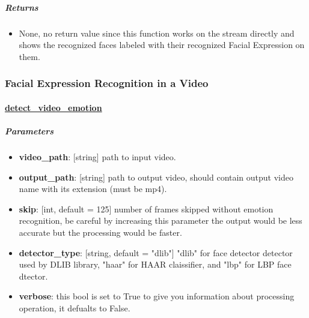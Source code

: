 \subparagraph{Returns}
\begin{changemargin}{0.5cm}{0cm}
\begin{itemize}[noitemsep,nolistsep]
	\item None, no return value since this function works on the stream directly and shows the recognized faces labeled with their recognized Facial Expression on them.
\end{itemize}
\end{changemargin}
	
\begin{comment}
\subparagraph{Usage}:
\begin{changemargin}{0.5cm}{0cm}
\begin{itemize}
	\item import the module:
	\begin{lstlisting}[language=Python]
	from Cerebro.interface Import video_stream as vs\end{lstlisting}
	\item call it:
	\begin{lstlisting}[language=Python]
	vs.detect_stream_emotions(skip)\end{lstlisting}
\end{itemize}
\end{changemargin}
\end{comment}
\hrulefill

\subsubsection{Facial Expression Recognition in a Video}
\paragraph{\underline{detect\_video\_emotion}}
\subparagraph{Parameters}
\begin{changemargin}{0.5cm}{0cm} 
	\begin{itemize}
		\item  \textbf{video\_path}: [string] path to input video.
		\item  \textbf{output\_path}: [string] path to output video, should contain output video name with its extension (must be mp4).
		\item  \textbf{skip}: [int, default = 125] number of frames skipped without emotion recognition, be careful by increasing this parameter the output would be less accurate but the processing would be faster.
		\item \textbf{detector\_type}: [string, default = "dlib"] "dlib" for face detector detector used by DLIB library, "haar" for HAAR claissifier, and "lbp" for LBP face dtector.
		\item  \textbf{verbose}: this bool is set to True to give you information about processing operation, it defualts to False.
	\end{itemize}
\end{changemargin}

